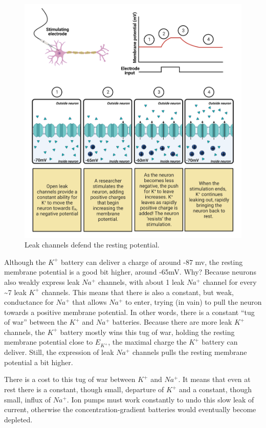 \documentclass[
]{book}
\begin{document}
\begin{figure}

{\centering \includegraphics[width=0.9\linewidth]{images/ch02/02_20} 

}

\caption{Leak channels defend the resting potential.}\label{fig:leak-and-rest}
\end{figure}

Although the \(K^+\) battery can deliver a charge of around -87 mv, the resting membrane potential is a good bit higher, around -65mV. Why? Because neurons also weakly express leak \(Na^+\) channels, with about 1 leak \(Na^+\) channel for every \textasciitilde7 leak \(K^+\) channels. This means that there is also a constant, but weak, conductance for \(Na^+\) that allows \(Na^+\) to enter, trying (in vain) to pull the neuron towards a positive membrane potential. In other words, there is a constant ``tug of war'' between the \(K^+\) and \(Na^+\) batteries. Because there are more leak \(K^+\) channels, the \(K^+\) battery mostly wins this tug of war, holding the resting membrane potential close to \(E_{K^+}\), the maximal charge the \(K^+\) battery can deliver. Still, the expression of leak \(Na^+\) channels pulls the resting membrane potential a bit higher.

There is a cost to this tug of war between \(K^+\) and \(Na^+\). It means that even at rest there is a constant, though small, departure of \(K^+\) and a constant, though small, influx of \(Na^+\). Ion pumps must work constantly to undo this slow leak of current, otherwise the concentration-gradient batteries would eventually become depleted.
\end{document}
